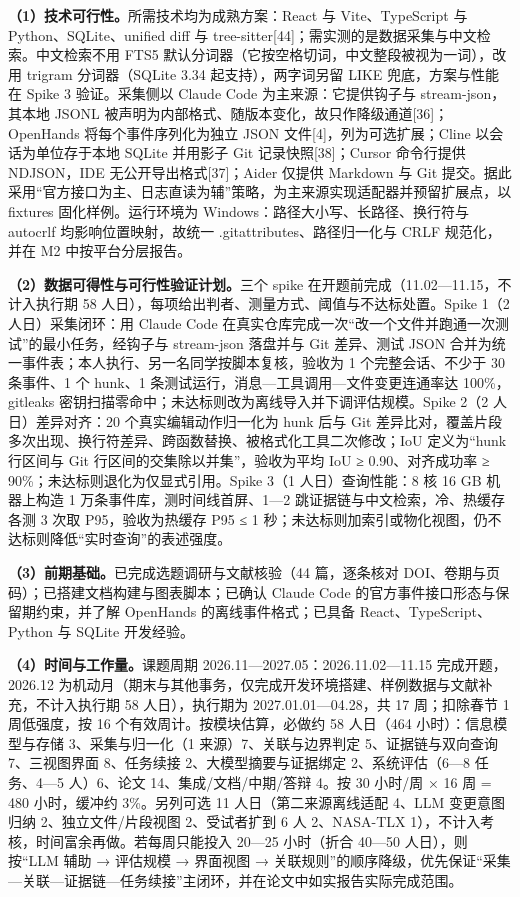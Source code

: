 \textbf{（1）技术可行性。}所需技术均为成熟方案：React 与 Vite、TypeScript 与 Python、SQLite、unified diff 与 tree-sitter[44]；需实测的是数据采集与中文检索。中文检索不用 FTS5 默认分词器（它按空格切词，中文整段被视为一词），改用 trigram 分词器（SQLite 3.34 起支持），两字词另留 LIKE 兜底，方案与性能在 Spike 3 验证。采集侧以 Claude Code 为主来源：它提供钩子与 stream-json，其本地 JSONL 被声明为内部格式、随版本变化，故只作降级通道[36]；OpenHands 将每个事件序列化为独立 JSON 文件[4]，列为可选扩展；Cline 以会话为单位存于本地 SQLite 并用影子 Git 记录快照[38]；Cursor 命令行提供 NDJSON，IDE 无公开导出格式[37]；Aider 仅提供 Markdown 与 Git 提交。据此采用“官方接口为主、日志直读为辅”策略，为主来源实现适配器并预留扩展点，以 fixtures 固化样例。运行环境为 Windows：路径大小写、长路径、换行符与 autocrlf 均影响位置映射，故统一 .gitattributes、路径归一化与 CRLF 规范化，并在 M2 中按平台分层报告。

\textbf{（2）数据可得性与可行性验证计划。}三个 spike 在开题前完成（11.02—11.15，不计入执行期 58 人日），每项给出判者、测量方式、阈值与不达标处置。Spike 1（2 人日）采集闭环：用 Claude Code 在真实仓库完成一次“改一个文件并跑通一次测试”的最小任务，经钩子与 stream-json 落盘并与 Git 差异、测试 JSON 合并为统一事件表；本人执行、另一名同学按脚本复核，验收为 1 个完整会话、不少于 30 条事件、1 个 hunk、1 条测试运行，消息—工具调用—文件变更连通率达 100\%，gitleaks 密钥扫描零命中；未达标则改为离线导入并下调评估规模。Spike 2（2 人日）差异对齐：20 个真实编辑动作归一化为 hunk 后与 Git 差异比对，覆盖片段多次出现、换行符差异、跨函数替换、被格式化工具二次修改；IoU 定义为“hunk 行区间与 Git 行区间的交集除以并集”，验收为平均 IoU ≥ 0.90、对齐成功率 ≥ 90\%；未达标则退化为仅显式引用。Spike 3（1 人日）查询性能：8 核 16 GB 机器上构造 1 万条事件库，测时间线首屏、1—2 跳证据链与中文检索，冷、热缓存各测 3 次取 P95，验收为热缓存 P95 ≤ 1 秒；未达标则加索引或物化视图，仍不达标则降低“实时查询”的表述强度。

\textbf{（3）前期基础。}已完成选题调研与文献核验（44 篇，逐条核对 DOI、卷期与页码）；已搭建文档构建与图表脚本；已确认 Claude Code 的官方事件接口形态与保留期约束，并了解 OpenHands 的离线事件格式；已具备 React、TypeScript、Python 与 SQLite 开发经验。

\textbf{（4）时间与工作量。}课题周期 2026.11—2027.05：2026.11.02—11.15 完成开题，2026.12 为机动月（期末与其他事务，仅完成开发环境搭建、样例数据与文献补充，不计入执行期 58 人日），执行期为 2027.01.01—04.28，共 17 周；扣除春节 1 周低强度，按 16 个有效周计。按模块估算，必做约 58 人日（464 小时）：信息模型与存储 3、采集与归一化（1 来源）7、关联与边界判定 5、证据链与双向查询 7、三视图界面 8、任务续接 2、大模型摘要与证据绑定 2、系统评估（6—8 任务、4—5 人）6、论文 14、集成/文档/中期/答辩 4。按 30 小时/周 × 16 周 = 480 小时，缓冲约 3\%。另列可选 11 人日（第二来源离线适配 4、LLM 变更意图归纳 2、独立文件/片段视图 2、受试者扩到 6 人 2、NASA-TLX 1），不计入考核，时间富余再做。若每周只能投入 20—25 小时（折合 40—50 人日），则按“LLM 辅助 → 评估规模 → 界面视图 → 关联规则”的顺序降级，优先保证“采集—关联—证据链—任务续接”主闭环，并在论文中如实报告实际完成范围。

